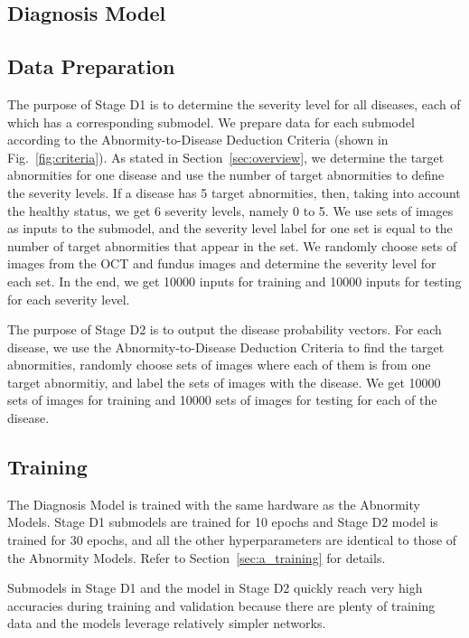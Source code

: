 \documentclass{article}
\begin{document}
\begin{multicols}{2}
	\section{Diagnosis Model}
	
	\subsection{Data Preparation}
	
	The purpose of Stage D1 is to determine the severity level for all diseases, each of which has a corresponding submodel. We prepare data for each submodel according to the Abnormity-to-Disease Deduction Criteria (shown in Fig.~\ref{fig:criteria}). As stated in Section~\ref{sec:overview}, we determine the target abnormities for one disease and use the number of target abnormities to define the severity levels. If a disease has 5 target abnormities, then, taking into account the healthy status, we get 6 severity levels, namely 0 to 5. We use sets of images as inputs to the submodel, and the severity level label for one set is equal to the number of target abnormities that appear in the set. We randomly choose sets of images from the OCT and fundus images and determine the severity level for each set. In the end, we get 10000 inputs for training and 10000 inputs for testing for each severity level. 
	
	The purpose of Stage D2 is to output the disease probability vectors. For each disease, we use the Abnormity-to-Disease Deduction Criteria to find the target abnormities, randomly choose sets of images where each of them is from one target abnormitiy, and label the sets of images with the disease. We get 10000 sets of images for training and 10000 sets of images for testing for each of the disease.
	
	\subsection{Training}
	
	The Diagnosis Model is trained with the same hardware as the Abnormity Models. Stage D1 submodels are trained for 10 epochs and Stage D2 model is trained for 30 epochs, and all the other hyperparameters are identical to those of the Abnormity Models. Refer to Section~\ref{sec:a_training} for details. 
	
	Submodels in Stage D1 and the model in Stage D2 quickly reach very high accuracies during training and validation because there are plenty of training data and the models leverage relatively simpler networks. 
	

\end{multicols}
\end{document}
